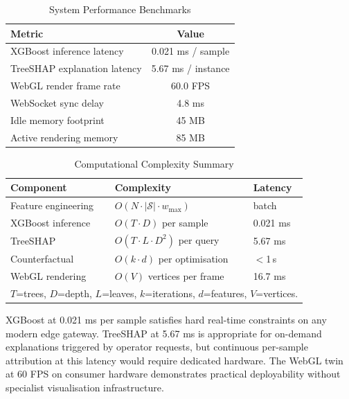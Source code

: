 \documentclass[10pt, journal, letterpaper]{IEEEtran}
\begin{document}
\begin{table}[htbp]
\caption{System Performance Benchmarks}
\label{tab:bench}
\centering\small
\begin{tabular}{lc}
\toprule
\textbf{Metric} & \textbf{Value} \\
\midrule
XGBoost inference latency    & 0.021 ms / sample \\
TreeSHAP explanation latency & 5.67 ms / instance \\
WebGL render frame rate      & 60.0 FPS \\
WebSocket sync delay         & 4.8 ms \\
Idle memory footprint        & 45 MB \\
Active rendering memory      & 85 MB \\
\bottomrule
\end{tabular}
\end{table}

\begin{table}[htbp]
\caption{Computational Complexity Summary}
\label{tab:complexity}
\centering\small
\begin{tabular}{lll}
\toprule
\textbf{Component} & \textbf{Complexity} & \textbf{Latency} \\
\midrule
Feature engineering  & $O(N \cdot |\mathcal{S}| \cdot w_{\max})$ & batch \\
XGBoost inference    & $O(T \cdot D)$ per sample          & 0.021 ms \\
TreeSHAP             & $O(T \cdot L \cdot D^2)$ per query & 5.67 ms  \\
Counterfactual       & $O(k \cdot d)$ per optimisation    & $<$1\,s  \\
WebGL rendering      & $O(V)$ vertices per frame          & 16.7 ms  \\
\bottomrule
\multicolumn{3}{l}{\footnotesize $T$=trees, $D$=depth, $L$=leaves, $k$=iterations, $d$=features, $V$=vertices.}
\end{tabular}
\end{table}

XGBoost at 0.021 ms per sample satisfies hard real-time constraints on any
modern edge gateway. TreeSHAP at 5.67 ms is appropriate for on-demand
explanations triggered by operator requests, but continuous per-sample
attribution at this latency would require dedicated hardware. The WebGL
twin at 60 FPS on consumer hardware demonstrates practical deployability
without specialist visualisation infrastructure.

\end{document}
